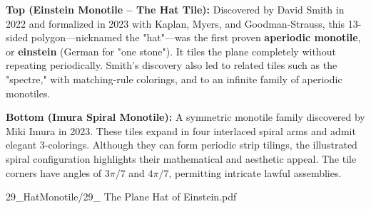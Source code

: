 \begin{SideNotePage}{
  \textbf{Top (Einstein Monotile – The Hat Tile):}  
  Discovered by David Smith in 2022 and formalized in 2023 with Kaplan, Myers, and Goodman-Strauss, this 13-sided polygon—nicknamed the "hat"—was the first proven \textbf{aperiodic monotile}, or \textbf{einstein} (German for "one stone"). It tiles the plane completely without repeating periodically. Smith’s discovery also led to related tiles such as the "spectre," with matching-rule colorings, and to an infinite family of aperiodic monotiles. \par

  \textbf{Bottom (Imura Spiral Monotile):}  
  A symmetric monotile family discovered by Miki Imura in 2023. These tiles expand in four interlaced spiral arms and admit elegant 3-colorings. Although they can form periodic strip tilings, the illustrated spiral configuration highlights their mathematical and aesthetic appeal. The tile corners have angles of $3\pi/7$ and $4\pi/7$, permitting intricate lawful assemblies. \par

}{29_HatMonotile/29_ The Plane Hat of Einstein.pdf}
\end{SideNotePage}
